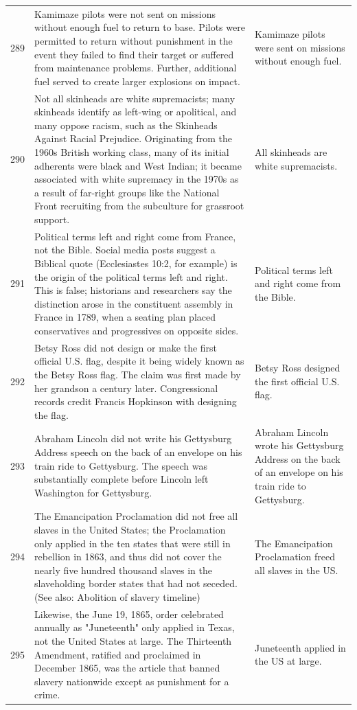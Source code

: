 \begin{tabular}{c|p{}|p{}}
289 & Kamimaze pilots were not sent on missions without enough fuel to return to base. Pilots were permitted to return without punishment in the event they failed to find their target or suffered from maintenance problems. Further, additional fuel served to create larger explosions on impact. & Kamimaze pilots were sent on missions without enough fuel. \\
290 & Not all skinheads are white supremacists; many skinheads identify as left-wing or apolitical, and many oppose racism, such as the Skinheads Against Racial Prejudice. Originating from the 1960s British working class, many of its initial adherents were black and West Indian; it became associated with white supremacy in the 1970s as a result of far-right groups like the National Front recruiting from the subculture for grassroot support. & All skinheads are white supremacists. \\
291 & Political terms left and right come from France, not the Bible. Social media posts suggest a Biblical quote (Ecclesiastes 10:2, for example) is the origin of the political terms left and right. This is false; historians and researchers say the distinction arose in the constituent assembly in France in 1789, when a seating plan placed conservatives and progressives on opposite sides. & Political terms left and right come from the Bible. \\
292 & Betsy Ross did not design or make the first official U.S. flag, despite it being widely known as the Betsy Ross flag. The claim was first made by her grandson a century later. Congressional records credit Francis Hopkinson with designing the flag. & Betsy Ross designed the first official U.S. flag. \\
293 & Abraham Lincoln did not write his Gettysburg Address speech on the back of an envelope on his train ride to Gettysburg. The speech was substantially complete before Lincoln left Washington for Gettysburg. & Abraham Lincoln wrote his Gettysburg Address on the back of an envelope on his train ride to Gettysburg. \\
294 & The Emancipation Proclamation did not free all slaves in the United States; the Proclamation only applied in the ten states that were still in rebellion in 1863, and thus did not cover the nearly five hundred thousand slaves in the slaveholding border states that had not seceded. (See also: Abolition of slavery timeline) & The Emancipation Proclamation freed all slaves in the US. \\
295 & Likewise, the June 19, 1865, order celebrated annually as "Juneteenth" only applied in Texas, not the United States at large. The Thirteenth Amendment, ratified and proclaimed in December 1865, was the article that banned slavery nationwide except as punishment for a crime. & Juneteenth applied in the US at large. \\

\end{tabular}
